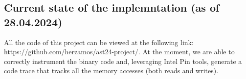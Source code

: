 \documentclass[acmsmall,review, nonacm]{acmart}
\begin{document}
\subsection{Current state of the implemntation (as of 28.04.2024)}
All the code of this project can be viewed at the following link: \url{https://github.com/herzamos/ast24-project/}.
At the moment, we are able to correctly instrument the binary code and, leveraging Intel Pin tools, generate 
a code trace that tracks all the memory accesses (both reads and writes).












\end{document}
